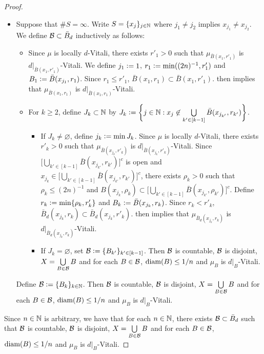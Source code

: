 \documentclass{book}
\begin{document}
\begin{proof}
\begin{itemize}
			\item Suppose that $\# S = \infty$. Write $S = \{x_j\}_{j \in \mathbb{N}}$ where $j_1 \neq j_2$ implies $x_{j_1} \neq x_{j_2}$. We define $\mathcal{B} \subset \bar{B}_d$ inductively as follows:
			\begin{itemize}
				\item Since $\mu$ is locally $d$-Vitali, there exists $r'_1 > 0$ such that $\mu_{\bar{B}(x_1, r'_1)}$ is $d|_{\bar{B}(x_1, r'_1)}$-Vitali. We define $j_1 \vcentcolon= 1$, $r_1 \vcentcolon= \min((2n)^{-1}, r'_1)$ and $B_1 \vcentcolon= \bar{B}(x_{j_1}, r_1)$. Since $r_1 \leq r'_1$, $\bar{B}(x_1, r_1) \subset \bar{B}(x_1, r'_1)$.  then implies that $\mu_{\bar{B}(x_1, r_1)}$ is $d|_{\bar{B}(x_1, r_1)}$-Vitali.
				\item For $k \geq 2$, define $J_k \subset \mathbb{N}$ by $J_k \vcentcolon= \bigg \{j \in \mathbb{N}: x_j \not \in \bigcup\limits_{k' \in [k-1]} \bar{B}(x_{j_{k'}}, r_{k'}) \bigg \}$.
				\begin{itemize}
					\item If $J_k \neq \varnothing$, define $j_k \vcentcolon= \min J_k$. Since $\mu$ is locally $d$-Vitali, there exists $r'_k > 0$ such that $\mu_{\bar{B}(x_{j_k}, r'_k)}$ is $d|_{\bar{B}(x_{j_k}, r'_k)}$-Vitali. Since $\bigg [ \bigcup\limits_{k' \in [k-1]} \bar{B}(x_{j_{k'}}, r_{k'}) \bigg]^c$ is open and $x_{j_k} \in \bigg [ \bigcup\limits_{k' \in [k-1]} \bar{B}(x_{j_{k'}}, r_{k'}) \bigg]^c$, there exists $\rho_k > 0$ such that $\rho_k \leq (2n)^{-1}$ and $B(x_{j_k}, \rho_k) \subset \bigg [ \bigcup\limits_{k' \in [k-1]} \bar{B}(x_{j_{k'}}, \rho_{k'}) \bigg]^c$. Define $r_k \vcentcolon= \min \{\rho_k, r'_k\}$ and $B_k \vcentcolon= \bar{B}(x_{j_k}, r_k)$. Since $r_k < r'_k$, $\bar{B}_d(x_{j_k}, r_k) \subset \bar{B}_d(x_{j_k}, r'_k)$.  then implies that $\mu_{\bar{B}_d(x_{j_k}, r_k)}$ is $d|_{\bar{B}_d(x_{j_k}, r_k)}$-Vitali. 
					\item If $J_k = \varnothing$, set $\mathcal{B} \vcentcolon= \{B_{k'}\}_{k' \in [k-1]}$. Then $\mathcal{B}$ is countable, $\mathcal{B}$ is disjoint, $X = \bigcup\limits_{B \in \mathcal{B}} B$ and for each $B \in \mathcal{B}$, $\operatorname{\text{diam}}(B) \leq 1/n$ and $\mu_B$ is $d|_B$-Vitali. 
				\end{itemize}
			\end{itemize}
			Define $\mathcal{B} \vcentcolon= \{B_k\}_{k \in \mathbb{N}}$. Then $\mathcal{B}$ is countable, $\mathcal{B}$ is disjoint, $X = \bigcup\limits_{B \in \mathcal{B}} B$ and for each $B \in \mathcal{B}$, $\operatorname{\text{diam}}(B) \leq 1/n$ and $\mu_B$ is $d|_B$-Vitali. 
		\end{itemize}
		Since $n \in \mathbb{N}$ is arbitrary, we have that for each $n \in \mathbb{N}$, there exists $\mathcal{B} \subset \bar{B}_d$ such that $\mathcal{B}$ is countable, $\mathcal{B}$ is disjoint, $X = \bigcup\limits_{B \in \mathcal{B}} B$ and for each $B \in \mathcal{B}$, $\operatorname{\text{diam}}(B) \leq 1/n$ and $\mu_B$ is $d|_B$-Vitali.  
	\end{proof}
	
\end{document}
